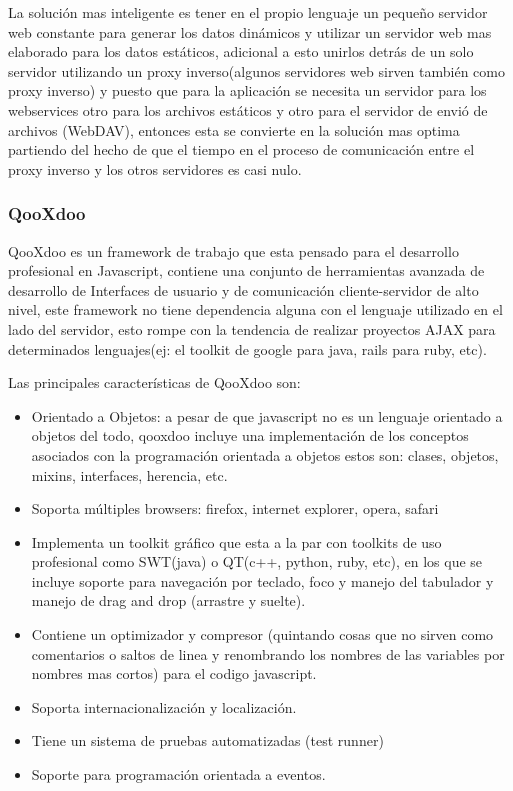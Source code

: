 La solución mas inteligente es tener en el propio lenguaje un pequeño servidor web constante para generar los datos dinámicos y utilizar un servidor web mas elaborado para los datos estáticos, adicional a esto unirlos detrás de un solo servidor utilizando un proxy inverso(algunos servidores web sirven también como proxy inverso) y puesto que para la aplicación se necesita un servidor para los webservices otro para los archivos estáticos y otro para el servidor de envió de archivos (WebDAV), entonces esta se convierte en la solución mas optima partiendo del hecho de que el tiempo en el proceso de comunicación entre el proxy inverso y los otros servidores es casi nulo.


\subsubsection*{QooXdoo \cite{qooxdoo} }

QooXdoo es un framework de trabajo que esta pensado para el desarrollo profesional en Javascript, contiene una conjunto de herramientas avanzada de desarrollo de Interfaces de usuario y de comunicación cliente-servidor de alto nivel, este framework no tiene dependencia alguna con el lenguaje utilizado en el lado del servidor, esto rompe con la tendencia de realizar proyectos AJAX para determinados lenguajes(ej: el toolkit de google para java, rails para ruby, etc).

Las principales características de QooXdoo son:

\begin{itemize}

	\item Orientado a Objetos: a pesar de que javascript no es un lenguaje orientado a objetos del todo, qooxdoo incluye una implementación de los conceptos asociados con la programación orientada a objetos estos son: clases, objetos, mixins, interfaces, herencia, etc.
	
	\item Soporta múltiples browsers: firefox, internet explorer, opera, safari
	\item Implementa un toolkit gráfico que esta a la par con toolkits de uso profesional como SWT(java) o QT(c++, python, ruby, etc), en los que se incluye soporte para navegación por teclado, foco y manejo del tabulador y manejo de drag and drop (arrastre y suelte).
	\item Contiene un optimizador y compresor (quintando cosas que no sirven como comentarios o saltos de linea y renombrando los nombres de las variables por nombres mas cortos) para el codigo javascript.
	\item Soporta internacionalización y localización.
	\item Tiene un sistema de pruebas automatizadas (test runner)
	\item Soporte para programación orientada a eventos.

\end{itemize}


